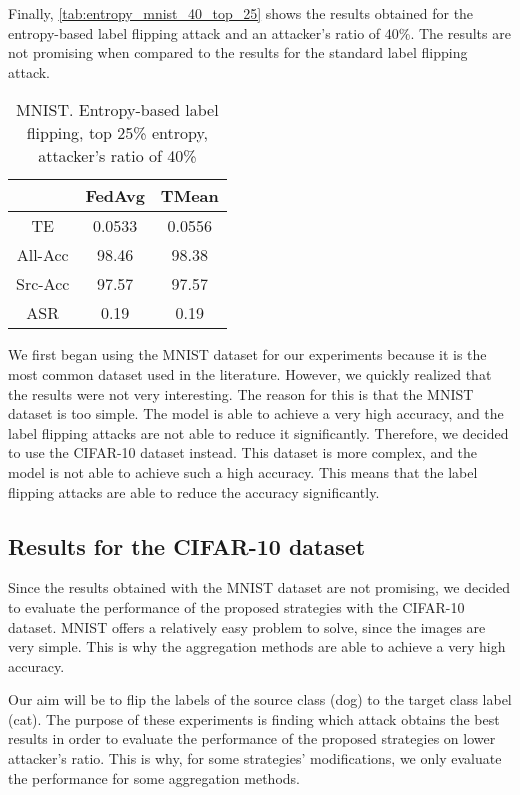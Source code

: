 Finally, \autoref{tab:entropy_mnist_40_top_25} shows the results obtained for the entropy-based label flipping attack and an attacker's ratio of 40\%.
The results are not promising when compared to the results for the standard label flipping attack.

\begin{table}[h!]
        \centering
        \begin{tabular}{|c|c|c|}
            \hline
            & FedAvg & TMean \\
            \hline
            TE & 0.0533 & 0.0556 \\
            \hline
            All-Acc & 98.46 & 98.38 \\
            \hline
            Src-Acc & 97.57 & 97.57 \\
            \hline
            ASR & 0.19 & 0.19 \\
            \hline
        \end{tabular}
        \caption{MNIST. Entropy-based label flipping, top 25\% entropy, attacker's ratio of 40\%}
        \label{tab:entropy_mnist_40_top_25}
    \end{table}
We first began using the MNIST dataset for our experiments because it is the most common dataset used in the literature. However, we quickly realized that the results were not very interesting. The reason for this is that the MNIST dataset is too simple. The model is able to achieve a very high accuracy, and the label flipping attacks are not able to reduce it significantly. Therefore, we decided to use the CIFAR-10 dataset instead. This dataset is more complex, and the model is not able to achieve such a high accuracy. This means that the label flipping attacks are able to reduce the accuracy significantly. 
    

\subsection{Results for the CIFAR-10 dataset}
Since the results obtained with the MNIST dataset are not promising, we decided to evaluate the performance of the proposed strategies with the CIFAR-10 dataset.
MNIST offers a relatively easy problem to solve, since the images are very simple. This is why the aggregation methods are able to achieve a very high accuracy.

Our aim will be to flip the labels of the source class (dog) to the target class label (cat). 
The purpose of these experiments is finding which attack obtains the best results in order to evaluate the performance of the proposed strategies on lower attacker's ratio. This is why, for some strategies' modifications, we only evaluate the performance for some aggregation methods.

